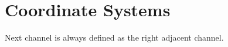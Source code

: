 \section{Coordinate Systems}
\label{sec:03_coordinates}

Next channel is always defined as the right adjacent channel.
